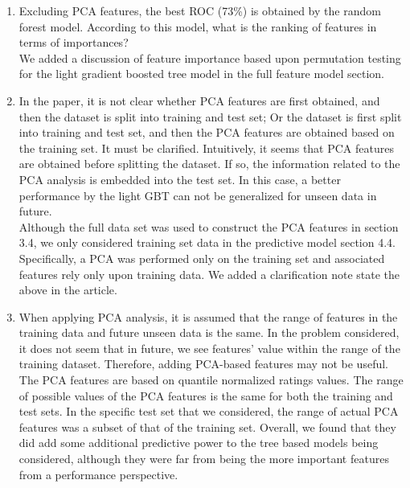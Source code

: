 \documentclass{amsart}[12pt]
\begin{document}
\begin{enumerate}
    \item   {\color{blue} 
        Excluding PCA features, the best ROC (73\%) is obtained by the random forest model. According to this model, what is the ranking of features in terms of importances?
        }\\
        We added a discussion of feature importance based upon permutation testing for the light gradient 
        boosted tree model in the full feature model section. 
    \item   {\color{blue} 
        In the paper, it is not clear whether PCA features are first obtained, and then the dataset is split into training and test set; Or the dataset is first split into training and test set, and then the PCA features are obtained based on the training set. It must be clarified. Intuitively, it seems that PCA features are obtained before splitting the dataset. If so, the information related to the PCA analysis is embedded into the test set. In this case, a better performance by the light GBT can not be generalized for unseen data in future.
        }\\

        Although the full data set was used to construct the PCA features in section 3.4, we only 
        considered training set data in the predictive model section 4.4.  Specifically, 
        a PCA was performed only on the training set and associated features rely only 
        upon training data.  We added a clarification note state the above in the article.

    \item   {\color{blue} 
        When applying PCA analysis, it is assumed that the range of features in the training data and future unseen data is the same. In the problem considered, it does not seem that in future, we see features' value within the range of the training dataset. Therefore, adding PCA-based features may not be useful. 
        }\\

    The PCA features are based on quantile normalized ratings values.  The range of possible values of the 
        PCA features is the same for both the training and test sets.  In the specific test set that 
        we considered, the range of actual PCA features was a subset of that of the training set.  
        Overall, we found that they did add some additional predictive power to the tree based 
        models being considered, although they were far from being the more important features 
        from a performance perspective. 


\end{enumerate}
\end{document}
